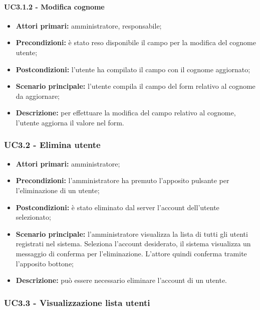 \paragraph{UC3.1.2 - Modifica cognome}

\begin{itemize}
	\item 	\textbf{Attori primari:} amministratore, responsabile;
	\item 	\textbf{Precondizioni:} è stato reso disponibile il campo per la modifica del cognome utente;
	\item 	\textbf{Postcondizioni:} l'utente ha compilato il campo con il cognome aggiornato;
	\item 	\textbf{Scenario principale:} l'utente compila il campo del form relativo al cognome da aggiornare;
	\item 	\textbf{Descrizione:} per effettuare la modifica del campo relativo al cognome, l'utente aggiorna il valore nel form.

\end{itemize}


\subsubsection{UC3.2 - Elimina utente}

\begin{itemize}
	\item 	\textbf{Attori primari:} amministratore;
	\item 	\textbf{Precondizioni:} l'amministratore ha premuto l'apposito pulsante per l'eliminazione di un utente;
	\item 	\textbf{Postcondizioni:} è stato eliminato dal server l'account dell'utente selezionato;
	\item 	\textbf{Scenario principale:} l'amministratore visualizza la lista di tutti gli utenti registrati nel sistema. Seleziona l'account desiderato, il sistema visualizza un messaggio di conferma per l'eliminazione. L'attore quindi conferma tramite l'apposito bottone; 
	\item 	\textbf{Descrizione:} può essere necessario eliminare l'account di un utente.
\end{itemize}

\subsubsection{UC3.3 - Visualizzazione lista utenti}

